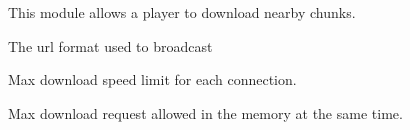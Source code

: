 
This module allows a player to download nearby chunks.

The url format used to broadcast


Max download speed limit for each connection.

Max download request allowed in the memory at the same time.


